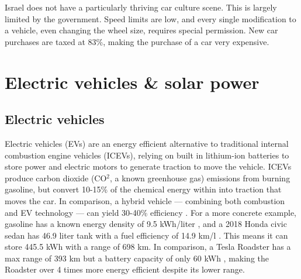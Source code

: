 \documentclass{report}                         %
\begin{document}

Israel does not have a particularly thriving car culture scene. This is largely limited by the government. Speed limits are low, and every single modification to a vehicle, even changing the wheel size, requires special permission. New car purchases are taxed at 83\%, making the purchase of a car very expensive.

\section{Electric vehicles \& solar power}
\subsection{Electric vehicles}
Electric vehicles (EVs) are an energy efficient alternative to traditional internal combustion engine vehicles (ICEVs), relying on built in lithium-ion batteries to store power and electric motors to generate traction to move the vehicle. ICEVs produce carbon dioxide (CO$^2$, a known greenhouse gas) emissions from burning gasoline, but convert 10-15\% of the chemical energy within into traction that moves the car. In comparison, a hybrid vehicle --- combining both combustion and EV technology --- can yield 30-40\% efficiency \cite{Zhu2015DistributedGrid}. For a more concrete example, gasoline has a known energy density of 9.5 kWh/liter \cite{EngineeringFactors}, and a 2018 Honda civic sedan has 46.9 liter tank with a fuel efficiency of 14.9 km/l \cite{20182018Information}. This means it can store 445.5 kWh with a range of 698 km. In comparison, a Tesla Roadster has a max range of 393 km but a battery capacity of only 60 kWh \cite{Friel2010ManagementVehicles}, making the Roadster over 4 times more energy efficient despite its lower range.
\end{document}
